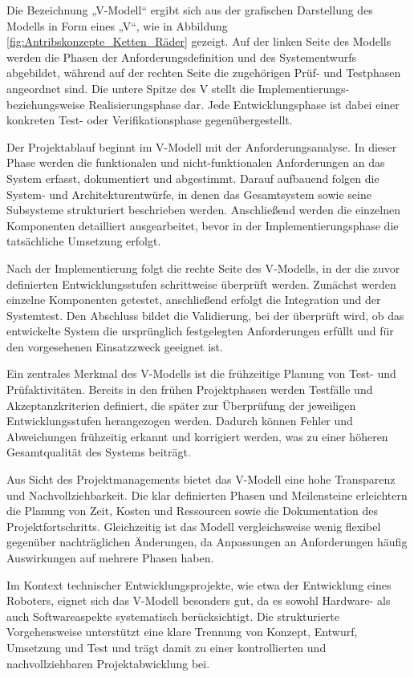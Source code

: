Die Bezeichnung „V-Modell“ ergibt sich aus der grafischen Darstellung des Modells in Form eines „V“, wie in Abbildung \ref{fig:Antribskonzepte_Ketten_Räder} gezeigt. Auf der linken Seite des Modells werden die Phasen der Anforderungsdefinition und des Systementwurfs abgebildet, während auf der rechten Seite die zugehörigen Prüf- und Testphasen angeordnet sind. Die untere Spitze des V stellt die Implementierungs- beziehungsweise Realisierungsphase dar. Jede Entwicklungsphase ist dabei einer konkreten Test- oder Verifikationsphase gegenübergestellt.

Der Projektablauf beginnt im V-Modell mit der Anforderungsanalyse. In dieser Phase werden die funktionalen und nicht-funktionalen Anforderungen an das System erfasst, dokumentiert und abgestimmt. Darauf aufbauend folgen die System- und Architekturentwürfe, in denen das Gesamtsystem sowie seine Subsysteme strukturiert beschrieben werden. Anschließend werden die einzelnen Komponenten detailliert ausgearbeitet, bevor in der Implementierungsphase die tatsächliche Umsetzung erfolgt. \cite{friedrich2024vmodellxt}\cite{cioBund2023vmodellxt}

Nach der Implementierung folgt die rechte Seite des V-Modells, in der die zuvor definierten Entwicklungsstufen schrittweise überprüft werden. Zunächst werden einzelne Komponenten getestet, anschließend erfolgt die Integration und der Systemtest. Den Abschluss bildet die Validierung, bei der überprüft wird, ob das entwickelte System die ursprünglich festgelegten Anforderungen erfüllt und für den vorgesehenen Einsatzzweck geeignet ist.

Ein zentrales Merkmal des V-Modells ist die frühzeitige Planung von Test- und Prüfaktivitäten. Bereits in den frühen Projektphasen werden Testfälle und Akzeptanzkriterien definiert, die später zur Überprüfung der jeweiligen Entwicklungsstufen herangezogen werden. Dadurch können Fehler und Abweichungen frühzeitig erkannt und korrigiert werden, was zu einer höheren Gesamtqualität des Systems beiträgt. \cite{friedrich2024vmodellxt}

Aus Sicht des Projektmanagements bietet das V-Modell eine hohe Transparenz und Nachvollziehbarkeit. Die klar definierten Phasen und Meilensteine erleichtern die Planung von Zeit, Kosten und Ressourcen sowie die Dokumentation des Projektfortschritts. Gleichzeitig ist das Modell vergleichsweise wenig flexibel gegenüber nachträglichen Änderungen, da Anpassungen an Anforderungen häufig Auswirkungen auf mehrere Phasen haben. 

Im Kontext technischer Entwicklungsprojekte, wie etwa der Entwicklung eines Roboters, eignet sich das V-Modell besonders gut, da es sowohl Hardware- als auch Softwareaspekte systematisch berücksichtigt. Die strukturierte Vorgehensweise unterstützt eine klare Trennung von Konzept, Entwurf, Umsetzung und Test und trägt damit zu einer kontrollierten und nachvollziehbaren Projektabwicklung bei.

